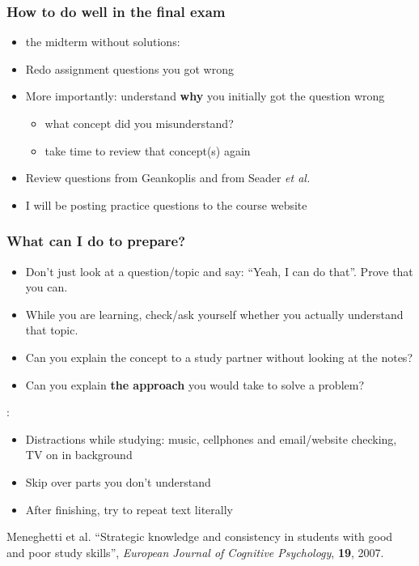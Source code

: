 \begin{frame}\frametitle{How to do well in the final exam}
	\begin{itemize}
		\item	{\color{myRed}{Repeat}} the midterm without solutions: \emph{{\color{myOrange}{it should be easy now}}}
		\item	Redo assignment questions you got wrong
		\item	More importantly: understand \textbf{why} you initially got the question wrong
			\begin{itemize}
				\item	what concept did you misunderstand?
				\item	take time to review that concept(s) again
			\end{itemize}
		\item	Review questions from Geankoplis and from Seader \emph{et al.}
		\item	I will be posting practice questions to the course website
	\end{itemize}
\end{frame}

\begin{frame}\frametitle{What can I do to prepare?}
	\textbf{{}}
	\begin{itemize}
		\item	Don't just look at a question/topic and say: ``Yeah, I can do that''. Prove that you can.
		\item	While you are learning, check/ask yourself whether you actually understand that topic.
		\item	Can you explain the concept to a study partner without looking at the notes?
		\item	Can you explain \textbf{the approach} you would take to solve a problem?
	\end{itemize}
	\textbf{{\color{myRed}{Poor students do this*}}}:
	\begin{itemize}
		\item	Distractions while studying: music, cellphones and email/website checking, TV on in background
		\item	Skip over parts you don't understand
		\item	After finishing, try to repeat text literally
	\end{itemize}
	\textbf{{\color{myRed}{*}}}{\tiny Meneghetti et al. ``Strategic knowledge and consistency in students with good and poor study skills'', \emph{European Journal of Cognitive Psychology}, \textbf{19}, 2007.}
\end{frame}

